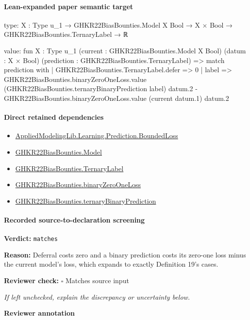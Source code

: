 \documentclass[10pt]{article}
\newcommand{\reviewerbox}{%
  \par\noindent\fbox{\parbox{0.96\linewidth}{\rule{0pt}{0.38in}}}\par
}
\newcommand{\reviewmatch}[1]{%
  \par\noindent\textbf{Reviewer check:} $\square$\; #1\par
  \noindent\emph{If left unchecked, explain the discrepancy or uncertainty below.}\par
}
\begin{document}
\paragraph{Lean-expanded paper semantic target}
\begin{ReviewVerbatim}
type:
{X : Type u_1} → GHKR22BiasBounties.Model X Bool → X × Bool → GHKR22BiasBounties.TernaryLabel → ℝ

value:
fun {X : Type u_1} (current : GHKR22BiasBounties.Model X Bool) (datum : X × Bool)
    (prediction : GHKR22BiasBounties.TernaryLabel) =>
  match prediction with
  | GHKR22BiasBounties.TernaryLabel.defer => 0
  | label =>
    GHKR22BiasBounties.binaryZeroOneLoss.value (GHKR22BiasBounties.ternaryBinaryPrediction label) datum.2 -
      GHKR22BiasBounties.binaryZeroOneLoss.value (current datum.1) datum.2
\end{ReviewVerbatim}

\paragraph{Direct retained dependencies}
\begin{itemize}\raggedright
\item \hyperlink{library-prerequisite-ce7caeacc1d4c7d3}{Applied\allowbreak{}Modeling\allowbreak{}Lib.\allowbreak{}Learning.\allowbreak{}Prediction.\allowbreak{}Bounded\allowbreak{}Loss}
\item \hyperlink{paper-prerequisite-333127605c12eba8}{GHKR22\allowbreak{}Bias\allowbreak{}Bounties.\allowbreak{}Model}
\item \hyperlink{governing-declaration-5996c0925e42d122}{GHKR22\allowbreak{}Bias\allowbreak{}Bounties.\allowbreak{}Ternary\allowbreak{}Label}
\item \hyperlink{governing-declaration-78e8cb53fdc44c21}{GHKR22\allowbreak{}Bias\allowbreak{}Bounties.\allowbreak{}binary\allowbreak{}Zero\allowbreak{}One\allowbreak{}Loss}
\item \hyperlink{governing-declaration-0fc300e2d68fad8c}{GHKR22\allowbreak{}Bias\allowbreak{}Bounties.\allowbreak{}ternary\allowbreak{}Binary\allowbreak{}Prediction}
\end{itemize}
\paragraph{Recorded source-to-declaration screening}
\textbf{Verdict:} \texttt{matches}
\\
{\raggedright
\textbf{Reason:} Deferral costs zero and a binary prediction costs its zero-\allowbreak{}one loss minus the current model's loss, which expands to exactly Definition 19's cases.\allowbreak{}
\par}
\reviewmatch{Matches source input}
\noindent\textbf{Reviewer annotation}\par
\reviewerbox
\clearpage
\hypertarget{paper-prerequisite-868c7eaf7196c687}{}
\end{document}
